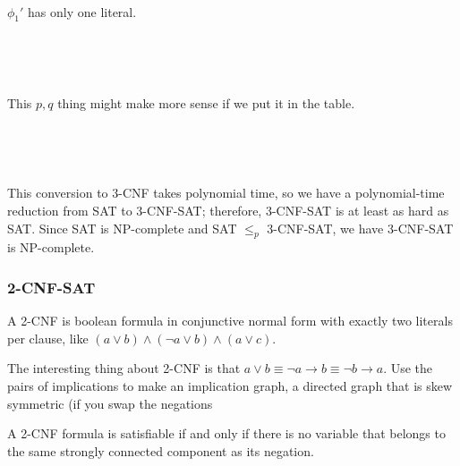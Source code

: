 \

$\phi_1'$ has only one literal.  

\


\

This $p,q$ thing might make more sense if we put it in the table.  

\


\

This conversion to 3-CNF takes polynomial time, so we have a polynomial-time reduction from SAT to 3-CNF-SAT; therefore, 3-CNF-SAT is at least as hard as SAT.  Since SAT is NP-complete and SAT $\le_p$ 3-CNF-SAT, we have 3-CNF-SAT is NP-complete.  

\subsubsection{2-CNF-SAT}

A 2-CNF is boolean formula in conjunctive normal form with exactly two literals per clause, like $(a \lor b) \land (\lnot a \lor b) \land (a \lor c)$.  

The interesting thing about 2-CNF is that $a \lor b \equiv \lnot a \to b \equiv \lnot b \to a$.  Use the pairs of implications to make an implication graph, a directed graph that is skew symmetric (if you swap the negations

A 2-CNF formula is satisfiable if and only if there is no variable that belongs to the same strongly connected component as its negation.  

